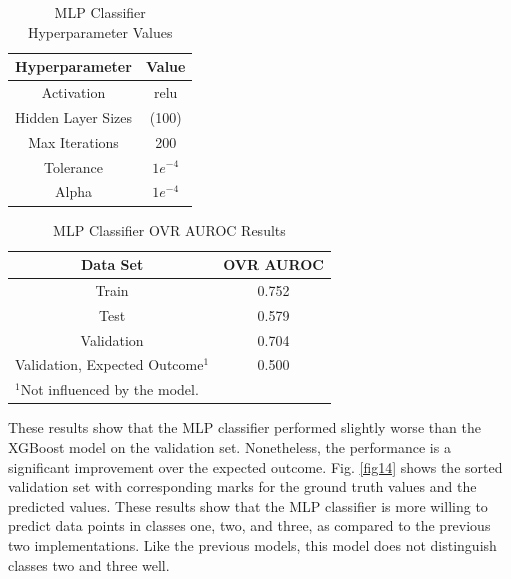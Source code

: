 \documentclass[conference]{IEEEtran}
\begin{document}
\begin{table}[htbp]
\caption{MLP Classifier Hyperparameter Values}
\begin{center}
\begin{tabular}{|c||c|}
\hline
\textbf{Hyperparameter} & \textbf{Value} \\
\hline
\hline
Activation & relu \\
\hline
Hidden Layer Sizes & (100) \\
\hline
Max Iterations & 200 \\
\hline
Tolerance & $1e^{-4}$ \\
\hline
Alpha & $1e^{-4}$ \\
\hline
\end{tabular}
\label{tab13}
\end{center}
\end{table}

\begin{table}[htbp]
\caption{MLP Classifier OVR AUROC Results}
\begin{center}
\begin{tabular}{|c||c|}
\hline
\textbf{Data Set} & \textbf{OVR AUROC} \\
\hline
\hline
Train & 0.752 \\
\hline
Test & 0.579 \\
\hline
Validation & 0.704 \\
\hline
Validation, Expected Outcome$^{\mathrm{1}}$ & 0.500 \\
\hline
\multicolumn{2}{l}{$^{\mathrm{1}}$Not influenced by the model.}
\end{tabular}
\label{tab14}
\end{center}
\end{table}

These results show that the MLP classifier performed slightly worse than the XGBoost model on the validation set. Nonetheless, the performance is a significant improvement over the expected outcome. Fig. \ref{fig14} shows the sorted validation set with corresponding marks for the ground truth values and the predicted values. These results show that the MLP classifier is more willing to predict data points in classes one, two, and three, as compared to the previous two implementations. Like the previous models, this model does not distinguish classes two and three well. 
\end{document}
